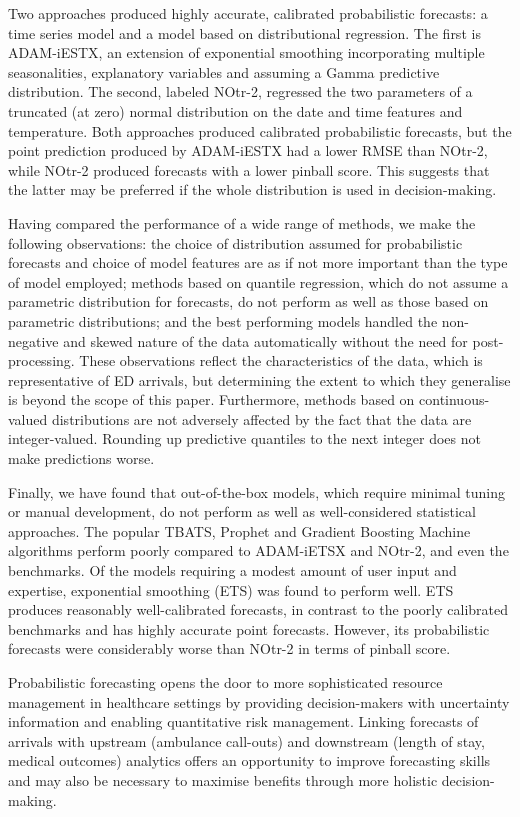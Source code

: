 \documentclass[]{elsarticle} %
\begin{document}
Two approaches produced highly accurate, calibrated probabilistic forecasts: a time series model and a model based on distributional regression. The first is ADAM-iESTX, an extension of exponential smoothing incorporating multiple seasonalities, explanatory variables and assuming a Gamma predictive distribution. The second, labeled NOtr-2, regressed the two parameters of a truncated (at zero) normal distribution on the date and time features and temperature. Both approaches produced calibrated probabilistic forecasts, but the point prediction produced by ADAM-iESTX had a lower RMSE than NOtr-2, while NOtr-2 produced forecasts with a lower pinball score. This suggests that the latter may be preferred if the whole distribution is used in decision-making.

Having compared the performance of a wide range of methods, we make the following observations: the choice of distribution assumed for probabilistic forecasts and choice of model features are as if not more important than the type of model employed; methods based on quantile regression, which do not assume a parametric distribution for forecasts, do not perform as well as those based on parametric distributions; and the best performing models handled the non-negative and skewed nature of the data automatically without the need for post-processing. These observations reflect the characteristics of the data, which is representative of ED arrivals, but determining the extent to which they generalise is beyond the scope of this paper. Furthermore, methods based on continuous-valued distributions are not adversely affected by the fact that the data are integer-valued. Rounding up predictive quantiles to the next integer does not make predictions worse.

Finally, we have found that out-of-the-box models, which require minimal tuning or manual development, do not perform as well as well-considered statistical approaches. The popular TBATS, Prophet and Gradient Boosting Machine algorithms perform poorly compared to ADAM-iETSX and NOtr-2, and even the benchmarks. Of the models requiring a modest amount of user input and expertise, exponential smoothing (ETS) was found to perform well. ETS produces reasonably well-calibrated forecasts, in contrast to the poorly calibrated benchmarks and has highly accurate point forecasts. However, its probabilistic forecasts were considerably worse than NOtr-2 in terms of pinball score.

Probabilistic forecasting opens the door to more sophisticated resource management in healthcare settings by providing decision-makers with uncertainty information and enabling quantitative risk management. Linking forecasts of arrivals with upstream (ambulance call-outs) and downstream (length of stay, medical outcomes) analytics offers an opportunity to improve forecasting skills and may also be necessary to maximise benefits through more holistic decision-making.
\end{document}
